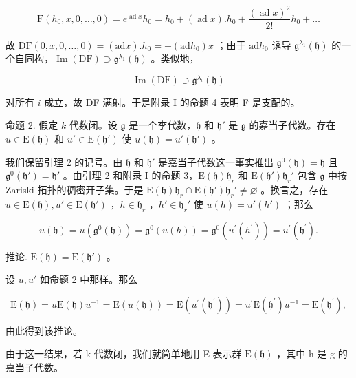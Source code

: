 \[
\mathrm{F} (h _ {0}, x, 0, \dots , 0) = e ^ {\operatorname{ad} x} h _ {0} = h _ {0} + (\operatorname{ad} x). h _ {0} + \frac {(\operatorname{ad} x) ^ {2}}{2 !} h _ {0} + \dots
\]

故 \(\mathrm{DF}(0,x,0,\ldots ,0) = (\mathrm{ad}x).h_0 = -(\mathrm{ad}h_0)x\) ；由于 \(\mathrm{ad}h_0\) 诱导 \(\mathfrak{g}^{\lambda_1}(\mathfrak{h})\) 的一个自同构，\(\operatorname {Im}(\mathrm{DF})\supset \mathfrak{g}^{\lambda_1}(\mathfrak{h})\) 。类似地，

\[
\operatorname{Im} (\mathrm{DF}) \supset \mathfrak {g} ^ {\lambda_ {i}} (\mathfrak {h})
\]

对所有 \(i\) 成立，故 DF 满射。于是附录 I 的命题 4 表明 F 是支配的。

命题 2. 假定 \(k\) 代数闭。设 \(\mathfrak{g}\) 是一个李代数，\(\mathfrak{h}\) 和 \(\mathfrak{h}'\) 是 \(\mathfrak{g}\) 的嘉当子代数。存在 \(u \in \mathrm{E}(\mathfrak{h})\) 和 \(u' \in \mathrm{E}(\mathfrak{h}')\) 使 \(u(\mathfrak{h}) = u'(\mathfrak{h}')\) 。

我们保留引理 2 的记号。由 \(\mathfrak{h}\) 和 \(\mathfrak{h}'\) 是嘉当子代数这一事实推出 \(\mathfrak{g}^0 (\mathfrak{h}) = \mathfrak{h}\) 且 \(\mathfrak{g}^0 (\mathfrak{h}') = \mathfrak{h}'\) 。由引理 2 和附录 I 的命题 3，\(\mathrm{E}(\mathfrak{h})\mathfrak{h}_r\) 和 \(\mathrm{E}(\mathfrak{h}')\mathfrak{h}_r'\) 包含 \(\mathfrak{g}\) 中按 Zariski 拓扑的稠密开子集。于是 \(\mathrm{E}(\mathfrak{h})\mathfrak{h}_r\cap \mathrm{E}(\mathfrak{h}')\mathfrak{h}_r' \neq \varnothing\) 。换言之，存在 \(u\in \mathrm{E}(\mathfrak{h}), u' \in \mathrm{E}(\mathfrak{h}')\) ，\(h\in \mathfrak{h}_r\) ，\(h' \in \mathfrak{h}_r'\) 使 \(u(h) = u'(h')\) ；那么

\[
u (\mathfrak {h}) = u \left(\mathfrak {g} ^ {0} (\mathfrak {h})\right) = \mathfrak {g} ^ {0} (u (h)) = \mathfrak {g} ^ {0} \left(u ^ {\prime} \left(h ^ {\prime}\right)\right) = u ^ {\prime} \left(\mathfrak {h} ^ {\prime}\right).
\]

推论. \(\mathrm{E}(\mathfrak{h}) = \mathrm{E}(\mathfrak{h}')\) 。

设 \(u, u'\) 如命题 2 中那样。那么

\[
\mathrm{E} (\mathfrak {h}) = u \mathrm{E} (\mathfrak {h}) u ^ {- 1} = \mathrm{E} (u (\mathfrak {h})) = \mathrm{E} (u ^ {\prime} (\mathfrak {h} ^ {\prime})) = u ^ {\prime} \mathrm{E} (\mathfrak {h} ^ {\prime}) u ^ {- 1} = \mathrm{E} (\mathfrak {h} ^ {\prime}),
\]

由此得到该推论。

由于这一结果，若 k 代数闭，我们就简单地用 E 表示群 \(\mathrm{E}(\mathfrak{h})\) ，其中 h 是 g 的嘉当子代数。

